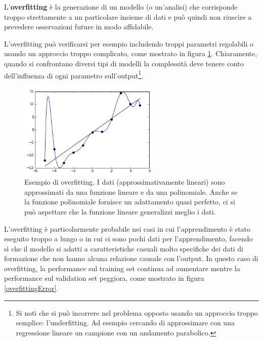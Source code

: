 \begin{defi}[Overfitting]
L'\textbf{overfitting} è la generazione di un modello (o un'analisi) che corrisponde troppo strettamente a un particolare insieme di dati e può quindi non riuscire a prevedere osservazioni future in modo affidabile.
\end{defi}

L'overfitting può verificarsi per esempio includendo troppi parametri regolabili o usando un approccio troppo complicato, come mostrato in figura \ref{overfittigComplex}. Chiaramente, quando si confrontano diversi tipi di modelli la complessità deve tenere conto dell'influenza di ogni parametro sull'output\footnote{Si noti che si può incorrere nel problema opposto usando un approccio troppo semplice: l'underfitting. Ad esempio cercando di approssimare con una regressione lineare un campione con un andamento parabolico.}.

\begin{figure}[htbp]
    \centering
    \includegraphics[width=0.6\textwidth]{images/Machine learning/Overfitted_Data.png}
    \caption{Esempio di overfitting. I dati (approssimativamente lineari) sono approssimati da una funzione lineare e da una polinomiale. Anche se la funzione polinomiale fornisce un adattamento quasi perfetto, ci si può aspettare che la funzione lineare generalizzi meglio i dati. \cite{wiki:overfitting}}
    \label{overfittigComplex}
\end{figure}

\newpage

L'overfitting è particolarmente probabile nei casi in cui l'apprendimento è stato eseguito troppo a lungo o in cui ci sono pochi dati per l'apprendimento, facendo sì che il modello si adatti a caratteristiche casuali molto specifiche dei dati di formazione che non hanno alcuna relazione causale con l'output. In questo caso di overfitting, la performance sul training set continua ad aumentare mentre la performance sul validation set peggiora, come mostrato in figura \ref{overfittingError}.



